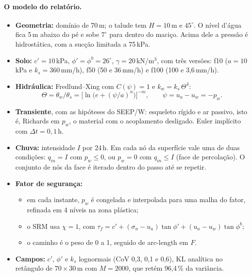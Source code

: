 \paragraph{O modelo do relatório.}
\begin{itemize}
  \item \textbf{Geometria:} domínio de 70\,m; o talude tem $H = 10$\,m e $45^\circ$. O nível d'água fica 5\,m abaixo
    do pé e sobe $7^\circ$ para dentro do maciço. Acima dele a pressão é hidrostática, com a sucção limitada a 75\,kPa.
  \item \textbf{Solo:} $c' = 10$\,kPa, $\phi' = \phi^b = 26^\circ$, $\gamma = 20$\,kN/m$^3$, com três versões: f10
    ($a = 10$\,kPa e $k_s = 360$\,mm/h), f50 (50 e 36\,mm/h) e f100 (100 e 3,6\,mm/h).
  \item \textbf{Hidráulica:} Fredlund--Xing com $C(\psi) = 1$ e $k_w = k_s\,\Theta^4$:
    \[
      \Theta = \theta_w/\theta_s = \big[\ln\big(e + (\psi/a)^n\big)\big]^{-m}, \qquad \psi = u_a - u_w = -p_w .
    \]
  \item \textbf{Transiente}, com as hipóteses do SEEP/W: esqueleto rígido e ar passivo, isto é, Richards em $p_w$, o
    material com o acoplamento desligado. Euler implícito com $\Delta t = 0{,}1$\,h.
  \item \textbf{Chuva:} intensidade $I$ por 24\,h. Em cada nó da superfície vale uma de duas condições: $q_{in} = I$ com
    $p_w \leq 0$, ou $p_w = 0$ com $q_{in} \leq I$ (face de percolação). O conjunto de nós da face é iterado dentro do
    passo até se repetir.
  \item \textbf{Fator de segurança:}
    \begin{itemize}
      \item em cada instante, $p_w$ é congelada e interpolada para uma malha do fator, refinada em 4 níveis na zona
        plástica;
      \item o SRM usa $\chi = 1$, com $\tau_f = c' + (\sigma_n - u_a)\tan\phi' + (u_a - u_w)\tan\phi^b$;
      \item o caminho é o peso de 0 a 1, seguido de arc-length em $F$.
    \end{itemize}
  \item \textbf{Campos:} $c'$, $\phi'$ e $k_s$ lognormais (CoV 0,3, 0,1 e 0,6), KL analítica no retângulo de
    $70 \times 30$\,m com $M = 2000$, que retém 96,4\,\% da variância.
\end{itemize}


